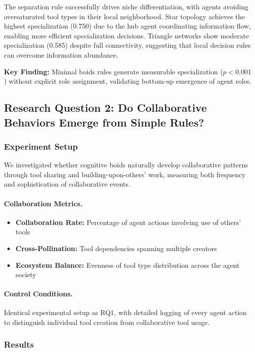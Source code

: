 The separation rule successfully drives niche differentiation, with agents avoiding oversaturated tool types in their local neighborhood. Star topology achieves the highest specialization (0.750) due to the hub agent coordinating information flow, enabling more efficient specialization decisions. Triangle networks show moderate specialization (0.585) despite full connectivity, suggesting that local decision rules can overcome information abundance. 

\textbf{Key Finding:} Minimal boids rules generate measurable specialization ($p < 0.001$) without explicit role assignment, validating bottom-up emergence of agent roles.

\subsection{Research Question 2: Do Collaborative Behaviors Emerge from Simple Rules?}

\subsubsection{Experiment Setup}
We investigated whether cognitive boids naturally develop collaborative patterns through tool sharing and building-upon-others' work, measuring both frequency and sophistication of collaborative events.

\paragraph{Collaboration Metrics.}
\begin{itemize}
    \item \textbf{Collaboration Rate:} Percentage of agent actions involving use of others' tools
    \item \textbf{Cross-Pollination:} Tool dependencies spanning multiple creators
    \item \textbf{Ecosystem Balance:} Evenness of tool type distribution across the agent society
\end{itemize}

\paragraph{Control Conditions.}
Identical experimental setup as RQ1, with detailed logging of every agent action to distinguish individual tool creation from collaborative tool usage.

\subsubsection{Results}


